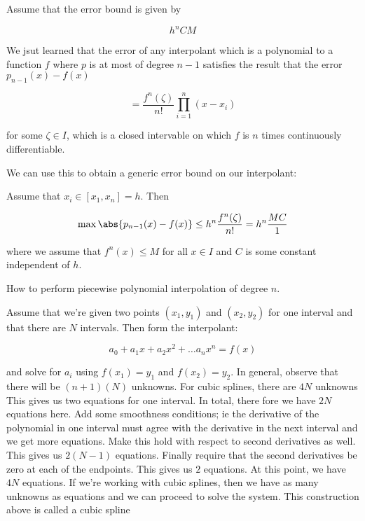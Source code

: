 \documentclass[../main.tex]{subfiles}
\begin{document}
Assume that the error bound is given by

\[
    h^n CM
\]



\begin{remark}
    We jsut learned that the error of any interpolant which is a polynomial to a function $f$ where $p$ is at most of degree $n-1$ satisfies the result that the error $p_{n-1}(x) - f(x)$

    \[
        = \frac{f^{n}(\zeta)}{n!}\prod_{i=1}^{n}(x -x_i)
    \]

for some $\zeta  \in I$, which is a closed intervable on which $f$ is $n$ times continuously differentiable.
\end{remark} 
We can use this to obtain a generic error bound on our interpolant:

Assume that $x_i \in [x_1, x_n] = h$. Then 

\[
    \max \abs{p_{n-1}(x) - f(x)} \leq h^n \frac{f^n(\zeta)}{n!} = h^n \frac{MC}{1}
\]

where we assume that $f^{n}(x) \leq M$ for all $x \in I$ and $C$ is some constant independent of $h$.


\begin{remark}
    How to perform piecewise polynomial interpolation of degree $n$.

    \begin{outline}
        \1 Assume that we're given two points $(x_1, y_1)$ and $(x_2, y_2)$ for one interval and that there are $N$ intervals. Then form the interpolant:

        \[
            a_0 + a_1x + a_2x^2 + \dots a_{n}x^{n} = f(x)
        \]

        and solve for $a_i$ using $f(x_1) = y_1$ and $f(x_2) = y_2$.
        \2 In general, observe that there will be $(n+1)(N)$ unknowns.
        \3 For cubic splines, there are $4N$ unknowns
        \2 This gives us two equations for one interval.
        \3 In total, there fore we have $2N$ equations here.
        \1 Add some smoothness conditions; ie the derivative of the polynomial in one interval must agree with the derivative in the next interval and we get more equations. Make this hold with respect to second derivatives as well.
        \2 This gives us $2(N-1)$ equations.
        \3 Finally require that the second derivatives be zero at each of the endpoints.
        \4 This gives us $2$ equations.
        \2 At this point, we have $4N$ equations. If we're working with cubic splines, then we have as many unknowns as equations and we can proceed to solve the system.
        \3 This construction above is called a cubic spline
    \end{outline}

\end{remark}
\end{document}
